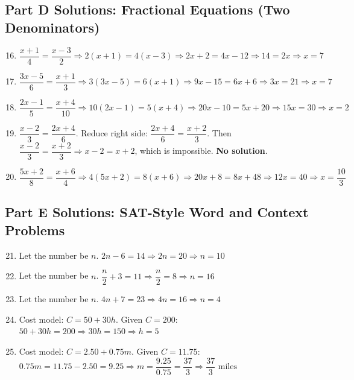 \documentclass[14pt]{extarticle}
\begin{document}
\subsection*{Part D Solutions: Fractional Equations (Two Denominators)}
\begin{enumerate}
    \setcounter{enumi}{15}
    \item \(\dfrac{x + 1}{4} = \dfrac{x - 3}{2} \Rightarrow 2(x + 1) = 4(x - 3) \Rightarrow 2x + 2 = 4x - 12 \Rightarrow 14 = 2x \Rightarrow x = \boxed{7}\)
    \item \(\dfrac{3x - 5}{6} = \dfrac{x + 1}{3} \Rightarrow 3(3x - 5) = 6(x + 1) \Rightarrow 9x - 15 = 6x + 6 \Rightarrow 3x = 21 \Rightarrow x = \boxed{7}\)
    \item \(\dfrac{2x - 1}{5} = \dfrac{x + 4}{10} \Rightarrow 10(2x - 1) = 5(x + 4) \Rightarrow 20x - 10 = 5x + 20 \Rightarrow 15x = 30 \Rightarrow x = \boxed{2}\)
    \item \(\dfrac{x - 2}{3} = \dfrac{2x + 4}{6}\). Reduce right side: \(\dfrac{2x + 4}{6} = \dfrac{x + 2}{3}\). Then \(\dfrac{x - 2}{3} = \dfrac{x + 2}{3} \Rightarrow x - 2 = x + 2\), which is impossible. \textbf{No solution}.
    \item \(\dfrac{5x + 2}{8} = \dfrac{x + 6}{4} \Rightarrow 4(5x + 2) = 8(x + 6) \Rightarrow 20x + 8 = 8x + 48 \Rightarrow 12x = 40 \Rightarrow x = \boxed{\dfrac{10}{3}}\)
\end{enumerate}

\subsection*{Part E Solutions: SAT-Style Word and Context Problems}
\begin{enumerate}
    \setcounter{enumi}{20}
    \item Let the number be \(n\). \(2n - 6 = 14 \Rightarrow 2n = 20 \Rightarrow n = \boxed{10}\)
    \item Let the number be \(n\). \(\dfrac{n}{2} + 3 = 11 \Rightarrow \dfrac{n}{2} = 8 \Rightarrow n = \boxed{16}\)
    \item Let the number be \(n\). \(4n + 7 = 23 \Rightarrow 4n = 16 \Rightarrow n = \boxed{4}\)
    \item Cost model: \(C = 50 + 30h\). Given \(C = 200\): \(50 + 30h = 200 \Rightarrow 30h = 150 \Rightarrow h = \boxed{5}\)
    \item Cost model: \(C = 2.50 + 0.75m\). Given \(C = 11.75\): \(0.75m = 11.75 - 2.50 = 9.25 \Rightarrow m = \dfrac{9.25}{0.75} = \dfrac{37}{3} \Rightarrow \boxed{\dfrac{37}{3}\text{ miles}}\)
\end{enumerate}




\end{document}
